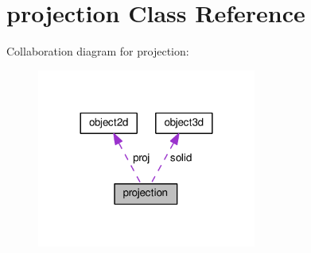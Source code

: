 \hypertarget{classprojection}{}\section{projection Class Reference}
\label{classprojection}


Collaboration diagram for projection\+:
\nopagebreak
\begin{figure}[H]
\begin{center}
\leavevmode
\includegraphics[width=204pt]{classprojection__coll__graph}
\end{center}
\end{figure}

